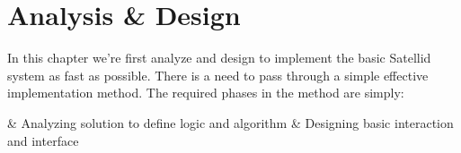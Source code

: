 \chapter{Analysis \& Design}
\label{chap:analysis-design}

In this chapter we're first analyze and design to implement the basic Satellid system as fast as possible.
There is a need to pass through a simple effective implementation method.
The required phases in the method are simply:

\begin{easylist}
& Analyzing solution to define logic and algorithm
& Designing basic interaction and interface
\end{easylist}

